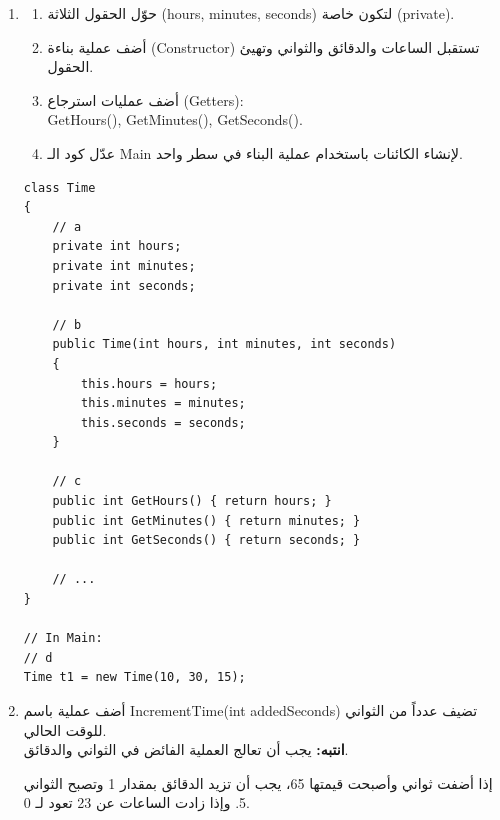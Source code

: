 \documentclass[14pt]{extarticle}
\begin{document}
\begin{enumerate}[itemsep=2em]
\begin{boxSolution}
\begin{english}
\begin{verbatim}
// In Main:
if (t2.IsBefore(t1))
    Console.WriteLine("t2 is earlier than t1");
    \end{verbatim}
    \end{english}
    \end{boxSolution}
    \fi
    \clearpage

    \item
    \begin{enumerate}
        \item حوّل الحقول الثلاثة (\textenglish{hours, minutes, seconds}) لتكون خاصة (\textenglish{private}).
        \item أضف عملية بناءة (\textenglish{Constructor}) تستقبل الساعات والدقائق والثواني وتهيئ الحقول.
        \item أضف عمليات استرجاع (\textenglish{Getters}): \\
         \textenglish{GetHours(), GetMinutes(), GetSeconds()}.
        \item عدّل كود الـ \textenglish{Main} لإنشاء الكائنات باستخدام عملية البناء في سطر واحد.
    \end{enumerate}

    \ifwithsols
    \begin{boxSolution}
    \begin{english}
    \begin{verbatim}
class Time
{
    // a
    private int hours;
    private int minutes;
    private int seconds;

    // b
    public Time(int hours, int minutes, int seconds)
    {
        this.hours = hours;
        this.minutes = minutes;
        this.seconds = seconds;
    }

    // c
    public int GetHours() { return hours; }
    public int GetMinutes() { return minutes; }
    public int GetSeconds() { return seconds; }

    // ...
}

// In Main:
// d
Time t1 = new Time(10, 30, 15);
    \end{verbatim}
    \end{english}
    \end{boxSolution}
    \clearpage
    \fi

    \item
    أضف عملية باسم \textenglish{IncrementTime(int addedSeconds)} تضيف عدداً من الثواني للوقت الحالي.\\
    \textbf{انتبه:} يجب أن تعالج العملية الفائض في الثواني والدقائق.
    \begin{boxExample}
    إذا أضفت ثواني وأصبحت قيمتها 65، يجب أن تزيد الدقائق بمقدار 1 وتصبح الثواني 5. وإذا زادت الساعات عن 23 تعود لـ 0.
    \end{boxExample}


\end{enumerate}
\end{document}
